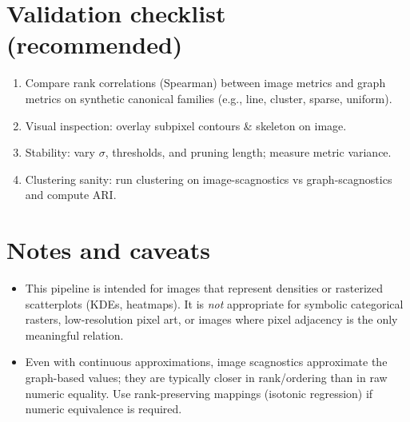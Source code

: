 \documentclass[11pt]{article}
\begin{document}
\section{Validation checklist (recommended)}
\begin{enumerate}[leftmargin=*,noitemsep]
  \item Compare rank correlations (Spearman) between image metrics and graph metrics on synthetic canonical families (e.g., line, cluster, sparse, uniform).
  \item Visual inspection: overlay subpixel contours \& skeleton on image.
  \item Stability: vary $\sigma$, thresholds, and pruning length; measure metric variance.
  \item Clustering sanity: run clustering on image-scagnostics vs graph-scagnostics and compute ARI.
\end{enumerate}

\section{Notes and caveats}
\begin{itemize}
  \item This pipeline is intended for images that represent densities or rasterized scatterplots (KDEs, heatmaps). It is \emph{not} appropriate for symbolic categorical rasters, low-resolution pixel art, or images where pixel adjacency is the only meaningful relation.
  \item Even with continuous approximations, image scagnostics approximate the graph-based values; they are typically closer in rank/ordering than in raw numeric equality. Use rank-preserving mappings (isotonic regression) if numeric equivalence is required.
\end{itemize}
\end{document}
